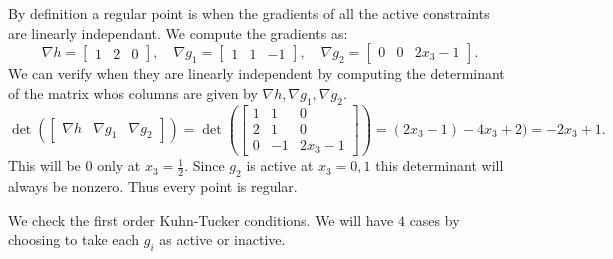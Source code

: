 \documentclass[12pt, a4paper]{article}
\theoremstyle{definition}
\newcommand{\grad}{\nabla}
\newcommand{\bmat}[1]{\begin{bmatrix}#1\end{bmatrix}}
\begin{document}
By definition a regular point is when the gradients of all the active constraints are linearly independant. We compute the gradients as:
$$\grad h = \bmat{1 & 2 & 0}, \quad \grad g_1 = \bmat{1 & 1 & -1}, \quad \grad g_2 = \bmat{0 & 0 & 2x_3 - 1}.$$
We can verify when they are linearly independent by computing the determinant of the matrix whos columns are given by $\grad h, \grad g_1, \grad g_2$. 
$$\det \left(\bmat{\grad h & \grad g_1 & \grad g_2} \right) = \det \left(\bmat{1 & 1 & 0 \\ 2 & 1 & 0 \\ 0 & -1 & 2x_3 - 1} \right) = (2x_3 - 1) - 4x_3 +2)  = -2x_3+1.$$
This will be $0$ only at $x_3 = \frac{1}{2}$. Since $g_2$ is active at $x_3 = 0,1$ this determinant will always be nonzero. Thus every point is regular. 
\item We check the first order Kuhn-Tucker conditions. We will have $4$ cases by choosing to take each $g_i$ as active or inactive. 
\end{document}

